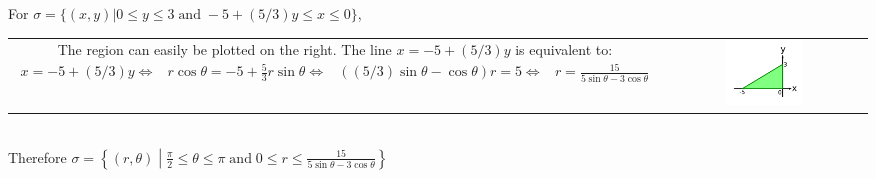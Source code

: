 \documentclass{article}
\newcommand{\dr}[1]{\textcolor{dark_red}{#1}}
\begin{document}
\dr{\begin{framed}
For \(\sigma = \{(x,y) | 0 \leq y \leq 3 \;\text{and}\; -5 + (5/3)y \leq x \leq 0\}\), \\
\begin{tabular}{cc}
\parbox{0.6\textwidth}{
The region can easily be plotted on the right. \\
The line \(x = -5 + (5/3)y\) is equivalent to: 
\begin{align*}
x = -5 + (5/3)y \iff & r\cos\theta = -5 + \frac{5}{3}r\sin\theta \\
\iff & ((5/3)\sin\theta - \cos\theta)r = 5 \\
\iff & r = \frac{15}{5\sin\theta - 3\cos\theta}
\end{align*}
} & \parbox{0.4\textwidth}{
\includegraphics[width = 0.4\textwidth]{Test_bench_part_3x_images/Test_bench_part_3x_Solutions_image_5}
}
\end{tabular} \\
Therefore \(\sigma = \left\{(r,\theta) \middle| \frac{\pi}{2} \leq \theta \leq \pi \;\text{and}\; 0 \leq r \leq \frac{15}{5\sin\theta - 3\cos\theta}\right\}\)
\end{framed}}
\end{document}
